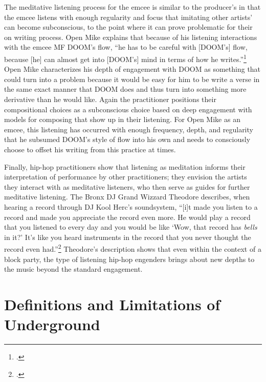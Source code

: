 The meditative listening process for the emcee is similar to the producer's in that the emcee
listens with enough regularity and focus that imitating other artists' can become subconscious,
to the point where it can prove problematic for their on writing process. Open Mike explains
that because of his listening interactions with the emcee MF DOOM's flow, ``he has to be 
careful with [DOOM's] flow, because [he] can almost get into [DOOM's] mind in terms of how he 
writes.''\footnote{\cite{estellecaswellRappingDeconstructedBest2016}.} Open Mike characterizes
his depth of engagement with DOOM as something that could turn into a problem because it would
be easy for him to be write a verse in the same exact manner that DOOM does and thus turn into
something more derivative than he would like. Again the practitioner positions their compositional
choices as a subconscious choice based on deep engagement with models for composing that show 
up in their listening. For Open Mike as an emcee, this listening has occurred with enough
frequency, depth, and regularity that he subsumed DOOM's style of flow into his own and needs
to consciously choose to offset his writing from this practice at times.

Finally, hip-hop practitioners show that listening as meditation informs their interpretation of
performance by other practitioners; they envision the artists they interact with as meditative
listeners, who then serve as guides for further meditative listening. The Bronx DJ Grand Wizzard
Theodore describes, when hearing a record through DJ Kool Herc's soundsystem, ``[i]t made you
listen to a record and made you appreciate the record even more. He would play a record that 
you listened to every day and you would be like `Wow, that record has \emph{bells} in it?' It's 
like you heard instruments in the record that you never thought the record even had.''\footnote{
\autocite[139]{christabronGlassHiphopProduction2015}.} Theodore's description shows that even
within the context of a block party, the type of listening hip-hop engenders brings about new
depths to the music beyond the standard engagement.

\section{Definitions and Limitations of Underground}


